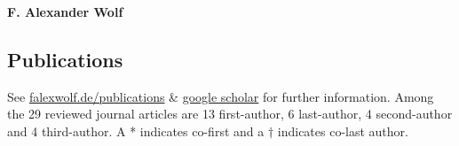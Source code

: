 \documentclass[11pt]{scrartcl}
\def\newline{\\[.4em]}
\begin{document}
\thispagestyle{firstpage}
\pagestyle{fancy}
\vspace*{1em}
\begin{center}\textbf{\LARGE{F. Alexander Wolf}}\end{center}


\setlength\LTleft{0em}
\subsection*{Publications}
See \href{https://falexwolf.de/publications}{falexwolf.de/publications} \& \href{http://scholar.google.de/citations?user=1FnOtMoAAAAJ\&hl=en}{google scholar} for further information. Among the 29 reviewed journal articles are 13 first-author, 6 last-author, 4 second-author and 4 third-author. A * indicates co-first and a $\dagger$ indicates co-last author.
\def\newline{\\[.6em]}


\newpage
\vspace{0em}

\end{document}
